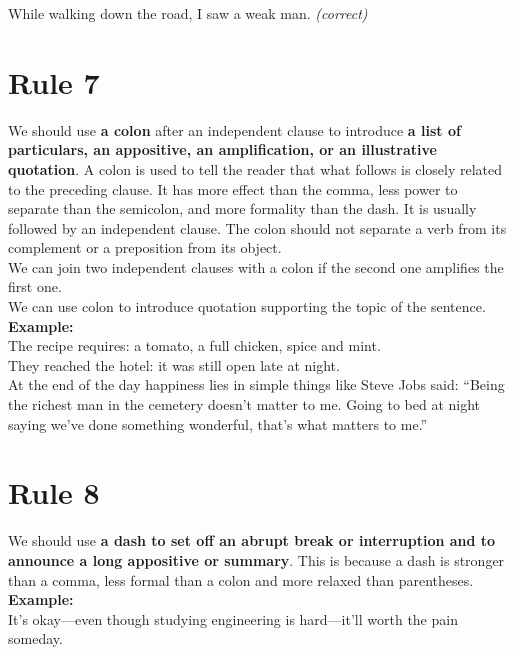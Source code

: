 \documentclass{report}
\begin{document}
While walking down the road, I saw a weak man. \textit{(correct)}

\section{Rule 7}
We should use \textbf{a colon} after an independent clause to introduce \textbf{ a list of particulars, an appositive, an amplification, or an illustrative quotation}. A colon is used to tell the reader that what follows is closely related to the preceding clause. It has more effect than the comma, less power to separate than the semicolon, and more formality than the dash. It is usually followed by an independent clause. The colon should not separate a verb from its complement or a preposition from its object.\\
We can join two independent clauses with a colon if the second one amplifies the first one.\\
We can use colon to introduce quotation supporting the topic of the sentence.
\textbf{Example:}\\
The recipe requires: a tomato, a full chicken, spice and mint.\\
They reached the hotel: it was still open late at night.\\
At the end of the day happiness lies in simple things like Steve Jobs said: ``Being the richest man in the cemetery doesn't matter to me. Going to bed at night saying we've done something wonderful, that's what matters to me.''

\section{Rule 8}
We should use \textbf{a dash to set off an abrupt break or interruption and to announce a long appositive or summary}. This is because a dash is stronger than a comma, less formal than a colon and more relaxed than parentheses.\\
\textbf{Example:}\\
It's okay---even though studying engineering is hard---it'll worth the pain someday.
\end{document}
